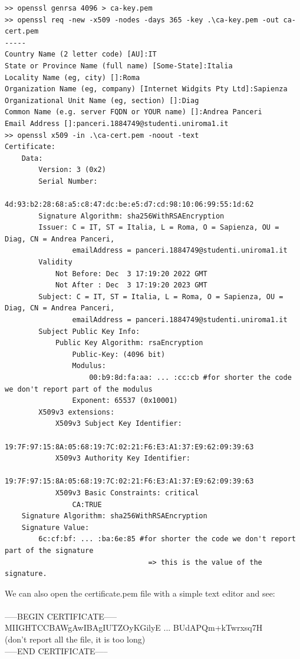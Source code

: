 \documentclass{article}
\begin{document}
\begin{lstlisting}[basicstyle=\tiny]
>> openssl genrsa 4096 > ca-key.pem
>> openssl req -new -x509 -nodes -days 365 -key .\ca-key.pem -out ca-cert.pem
-----
Country Name (2 letter code) [AU]:IT
State or Province Name (full name) [Some-State]:Italia
Locality Name (eg, city) []:Roma
Organization Name (eg, company) [Internet Widgits Pty Ltd]:Sapienza
Organizational Unit Name (eg, section) []:Diag
Common Name (e.g. server FQDN or YOUR name) []:Andrea Panceri
Email Address []:panceri.1884749@studenti.uniroma1.it
>> openssl x509 -in .\ca-cert.pem -noout -text
Certificate:
    Data:
        Version: 3 (0x2)
        Serial Number:
            4d:93:b2:28:68:a5:c8:47:dc:be:e5:d7:cd:98:10:06:99:55:1d:62
        Signature Algorithm: sha256WithRSAEncryption
        Issuer: C = IT, ST = Italia, L = Roma, O = Sapienza, OU = Diag, CN = Andrea Panceri,
                emailAddress = panceri.1884749@studenti.uniroma1.it
        Validity
            Not Before: Dec  3 17:19:20 2022 GMT
            Not After : Dec  3 17:19:20 2023 GMT
        Subject: C = IT, ST = Italia, L = Roma, O = Sapienza, OU = Diag, CN = Andrea Panceri,
                emailAddress = panceri.1884749@studenti.uniroma1.it
        Subject Public Key Info:
            Public Key Algorithm: rsaEncryption
                Public-Key: (4096 bit)
                Modulus:
                    00:b9:8d:fa:aa: ... :cc:cb #for shorter the code we don't report part of the modulus
                Exponent: 65537 (0x10001)
        X509v3 extensions:
            X509v3 Subject Key Identifier:
                19:7F:97:15:8A:05:68:19:7C:02:21:F6:E3:A1:37:E9:62:09:39:63
            X509v3 Authority Key Identifier:
                19:7F:97:15:8A:05:68:19:7C:02:21:F6:E3:A1:37:E9:62:09:39:63
            X509v3 Basic Constraints: critical
                CA:TRUE
    Signature Algorithm: sha256WithRSAEncryption
    Signature Value:
        6c:cf:bf: ... :ba:6e:85 #for shorter the code we don't report part of the signature 
                                  => this is the value of the signature.
\end{lstlisting}
We can also open the certificate.pem file with a simple text editor and see:\\\\
-----BEGIN CERTIFICATE-----\\
MIIGHTCCBAWgAwIBAgIUTZOyKGilyE ... BUdAPQm+kTwrxsq7H\\
(don't report all the file, it is too long)\\
-----END CERTIFICATE-----\\
\end{document}

